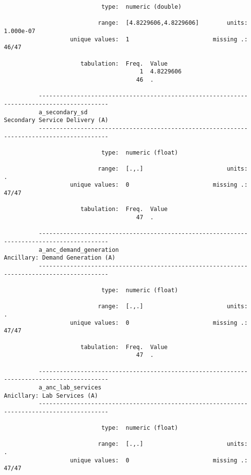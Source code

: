 \documentclass{article}
\begin{document}
\begin{verbatim}
                            type:  numeric (double)
          
                           range:  [4.8229606,4.8229606]        units:  1.000e-07
                   unique values:  1                        missing .:  46/47
          
                      tabulation:  Freq.  Value
                                       1  4.8229606
                                      46  .
          
          ------------------------------------------------------------------------------------------
          a_secondary_sd                                              Secondary Service Delivery (A)
          ------------------------------------------------------------------------------------------
          
                            type:  numeric (float)
          
                           range:  [.,.]                        units:  .
                   unique values:  0                        missing .:  47/47
          
                      tabulation:  Freq.  Value
                                      47  .
          
          ------------------------------------------------------------------------------------------
          a_anc_demand_generation                                   Ancillary: Demand Generation (A)
          ------------------------------------------------------------------------------------------
          
                            type:  numeric (float)
          
                           range:  [.,.]                        units:  .
                   unique values:  0                        missing .:  47/47
          
                      tabulation:  Freq.  Value
                                      47  .
          
          ------------------------------------------------------------------------------------------
          a_anc_lab_services                                             Anicllary: Lab Services (A)
          ------------------------------------------------------------------------------------------
          
                            type:  numeric (float)
          
                           range:  [.,.]                        units:  .
                   unique values:  0                        missing .:  47/47
          

\end{verbatim}
\end{document}
